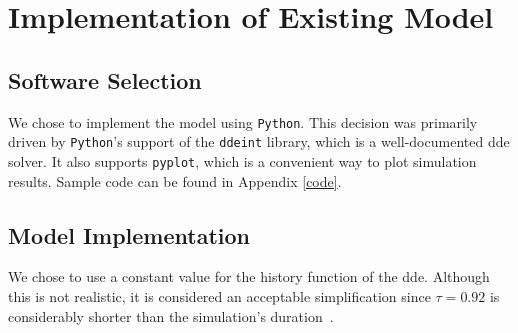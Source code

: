 \chapter{Implementation of Existing Model}

\section{Software Selection}

We chose to implement the model using \texttt{Python}. This decision was primarily driven by \texttt{Python}'s support of the \verb|ddeint| library, which is a well-documented \gls{dde} solver. It also supports \verb|pyplot|, which is a convenient way to plot simulation results. Sample code can be found in Appendix \ref{code}.




\section{Model Implementation}

We chose to use a constant value for the history function of the \gls{dde}. Although this is not realistic, it is considered an acceptable simplification since $\tau =0.92$  is considerably shorter than the simulation's duration~\cite{villasana2004}.



